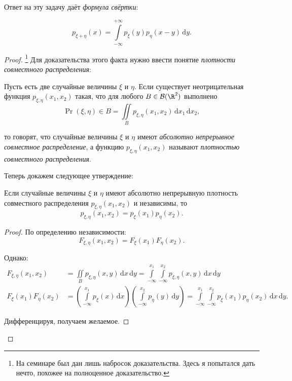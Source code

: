 Ответ на эту задачу даёт \emph{формула свёртки}:
\begin{theorem}
	\[p_{\xi + \eta}(x) = \int\limits_{-\infty}^{+\infty}p_{\xi}(y)p_{\eta}(x - y)\,\mathrm{d}y.\]
\end{theorem}
\begin{proof}\footnote{На семинаре был дан лишь набросок доказательства. Здесь я попытался дать нечто, похожее на полноценное доказательство.}
	Для доказательства этого факта нужно ввести понятие \emph{плотности совместного распределения}:
	\begin{definition}
		Пусть есть две случайные величины \(\xi\) и \(\eta\). Если существует неотрицательная функция \(p_{\xi, \eta}(x_1, x_2)\) такая, что для любого \(B \in \mathcal{B}(\R^2)\) выполнено
		\[\Pr{(\xi, \eta) \in B} = \iint\limits_{B} p_{\xi, \eta}(x_1, x_2)\,\mathrm{d}x_1\,\mathrm{d}x_2,\]
		
		то говорят, что случайные величины \(\xi\) и \(\eta\) имеют \emph{абсолютно непрерывное совместное распределение}, а функцию \(p_{\xi, \eta}(x_1, x_2)\) называют \emph{плотностью совместного распределения}.
	\end{definition}

	Теперь докажем следующее утверждение:
	\begin{theorem}
		Если случайные величины \(\xi\) и \(\eta\) имеют абсолютно непрерывную плотность совместного распределения \(p_{\xi, \eta}(x_1, x_2)\) и независимы, то
		\[p_{\xi, \eta}(x_1, x_2) = p_{\xi}(x_1)p_{\eta}(x_2).\]
	\end{theorem}
	\begin{proof}
		По определению независимости:
		\[F_{\xi, \eta}(x_1, x_2) = F_{\xi}(x_1)F_{\eta}(x_2).\]
		
		Однако:
		\begin{align}
			F_{\xi, \eta}(x_1, x_2) &= \iint\limits_{B} p_{\xi, \eta}(x, y)\,\mathrm{d}x\,\mathrm{d}y = \int\limits_{-\infty}^{x_1} \int\limits_{-\infty}^{x_2} p_{\xi, \eta}(x, y)\,\mathrm{d}x\,\mathrm{d}y \\
			F_{\xi}(x_1)F_{\eta}(x_2) &= \left(\int\limits_{-\infty}^{x_1} p_{\xi}(x)\,\mathrm{d}x\right)\left(\int\limits_{-\infty}^{x_2} p_{\eta}(y)\,\mathrm{d}y \right) = \int\limits_{-\infty}^{x_1} \int\limits_{-\infty}^{x_2} p_{\xi}(x_1)p_{\eta}(x_2)\,\mathrm{d}x\,\mathrm{d}y.
		\end{align}
		
		Дифференцируя, получаем желаемое.
	\end{proof}


\end{proof}
